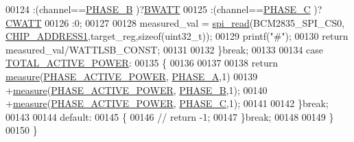 \begin{DoxyCode}
00124                                             :(channel==\hyperlink{a00042_ad7b96feed1e1c12515dad5e926b2c62e}{PHASE\_B} )?\hyperlink{a00035_a3a60995ae993fd06892df7023a9f496c}{BWATT}
00125                                             :(channel==\hyperlink{a00042_a3ceb83fb10c2af19b468d508448f24e2}{PHASE\_C} )?\hyperlink{a00035_aeb58aae2f3e0c16a12cf4b6b03d6c5d9}{CWATT}
00126                                             :0;         
00127                                           
00128                     measured\_val = \hyperlink{a00006_ga7ad9f65ee46aca507374096506a0b1c4}{spi\_read}(BCM2835\_SPI\_CS0,
      \hyperlink{a00036_a94de2b046db6e10257ef4481c0a15eaa}{CHIP\_ADDRESS1},target\_reg,\textcolor{keyword}{sizeof}(uint32\_t));
00129                     printf(\textcolor{stringliteral}{"#"});
00130                     \textcolor{keywordflow}{return} measured\_val/WATTLSB\_CONST;
00131                     
00132                 \}\textcolor{keywordflow}{break};
00133                 
00134                 \textcolor{keywordflow}{case}  \hyperlink{a00042_a7d0d4057be5aaf168a22ee4379e6ff30}{TOTAL\_ACTIVE\_POWER}:
00135                 \{
00136                 
00137                             
00138                      \textcolor{keywordflow}{return} \hyperlink{a00008_gac914ebaa64afce03ee852af09659cf69}{measure}(\hyperlink{a00042_abd3f95c7cd63d0627552d293bf49e026}{PHASE\_ACTIVE\_POWER},
      \hyperlink{a00042_ad214039f52b011ce2bd6c85ff98a981b}{PHASE\_A},1)
00139                             +\hyperlink{a00008_gac914ebaa64afce03ee852af09659cf69}{measure}(\hyperlink{a00042_abd3f95c7cd63d0627552d293bf49e026}{PHASE\_ACTIVE\_POWER},
      \hyperlink{a00042_ad7b96feed1e1c12515dad5e926b2c62e}{PHASE\_B},1);
00140                             +\hyperlink{a00008_gac914ebaa64afce03ee852af09659cf69}{measure}(\hyperlink{a00042_abd3f95c7cd63d0627552d293bf49e026}{PHASE\_ACTIVE\_POWER},
      \hyperlink{a00042_a3ceb83fb10c2af19b468d508448f24e2}{PHASE\_C},1);
00141                     
00142                 \}\textcolor{keywordflow}{break};
00143                 
00144                 \textcolor{keywordflow}{default}:
00145                 \{    
00146                   \textcolor{comment}{// return -1;}
00147                 \}\textcolor{keywordflow}{break};
00148      
00149         \}
00150 \}
\end{DoxyCode}


